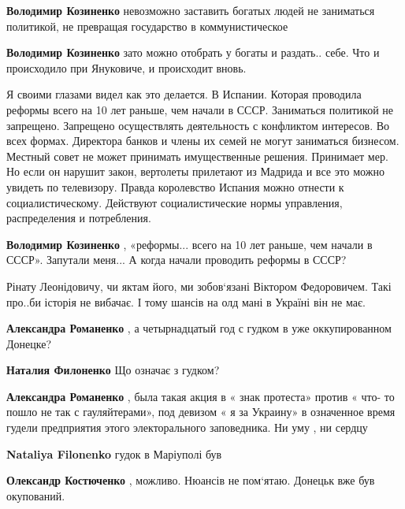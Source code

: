 \begin{itemize}
\begin{itemize} %
\textbf{Володимир Козиненко} невозможно заставить богатых людей не заниматься политикой, не превращая государство в коммунистическое

\textbf{Володимир Козиненко} зато можно отобрать у богаты и раздать.. себе. Что и происходило при Януковиче, и происходит вновь.


Я своими глазами видел как это делается. В Испании. Которая проводила реформы
всего на 10 лет раньше, чем начали в СССР. Заниматься политикой не запрещено.
Запрещено осуществлять деятельность с конфликтом интересов. Во всех формах.
Директора банков и члены их семей не могут заниматься бизнесом. Местный совет
не может принимать имущественные решения. Принимает мер. Но если он нарушит
закон, вертолеты прилетают из Мадрида и все это можно увидеть по телевизору.
Правда королевство Испания можно отнести к социалистическому. Действуют
социалистические нормы управления, распределения и потребления.


\textbf{Володимир Козиненко} , «реформы... всего на 10 лет раньше, чем начали в СССР». Запутали меня... А когда начали проводить реформы в СССР?
\end{itemize} %


Рінату Леонідовичу, чи яктам його, ми зобов‘язані Віктором Федоровичем. Такі
про..би історія не вибачає. І тому шансів на олд мані в Україні він не має.

\begin{itemize} %
\textbf{Александра Романенко} , а четырнадцатый год с гудком в уже оккупированном Донецке?

\textbf{Наталия Филоненко} Що означає з гудком?

\textbf{Александра Романенко} , была такая акция в « знак протеста» против « что- то пошло не так с гауляйтерами», под девизом « я за Украину» в означенное время гудели предприятия этого электорального заповедника. Ни уму , ни сердцу

\textbf{Nataliya Filonenko} гудок в Маріуполі був

\textbf{Олександр Костюченко} , можливо. Нюансів не пом‘ятаю. Донецьк вже був окупований.
\end{itemize} %


\end{itemize}
